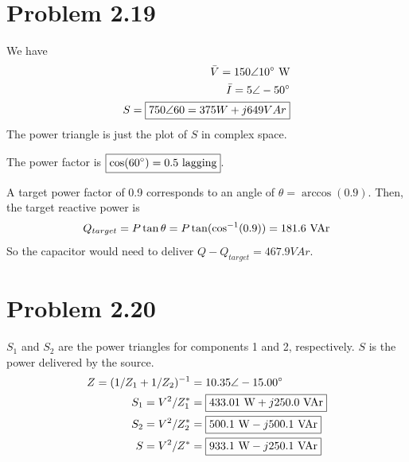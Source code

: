 \documentclass{homework}
\begin{document}
\section{Problem 2.19}
\begin{letterenum}
    \item We have
    \begin{align*}
        \bar{V} = 150 \angle 10 \degree \text{ W} \\
        \bar{I} = 5 \angle -50 \degree \\
        S = \boxed{750 \angle 60 = 375 W + j 649 VAr}
    \end{align*}
    The power triangle is just the plot of $S$ in complex space.

    \item The power factor is $\boxed{\cos(60\degree) = 0.5$ lagging$}$.
    \item A target power factor of 0.9 corresponds to an
        angle of $\theta = \arccos(0.9)$. Then, the target
        reactive power is
        \begin{equation*}
            Q_{target} = P\tan\theta = P\tan(\text{cos}^{-1}(0.9)) = 181.6 \text{ VAr}
        \end{equation*}
        So the capacitor would need to deliver
        $Q - Q_{target} = \boxed{467.9 VAr}$.
\end{letterenum}

\section{Problem 2.20}
$S_1$ and $S_2$ are the power triangles for components 1 and 2,
respectively. $S$ is the power delivered by the source.
\begin{align*}
    Z = (1 / Z_1 + 1 / Z_2)^{-1} &= 10.35 \angle -15.00 \degree \\
    S_1 = V^2 / Z_1^* &= \boxed{433.01 \text{ W} + j 250.0 \text{ VAr}} \\
    S_2 = V^2 / Z_2^* &= \boxed{500.1 \text{ W} - j 500.1 \text{ VAr}} \\
    S = V^2 / Z^* &= \boxed{933.1 \text{ W} - j250.1 \text{ VAr}}
\end{align*}
\end{document}
